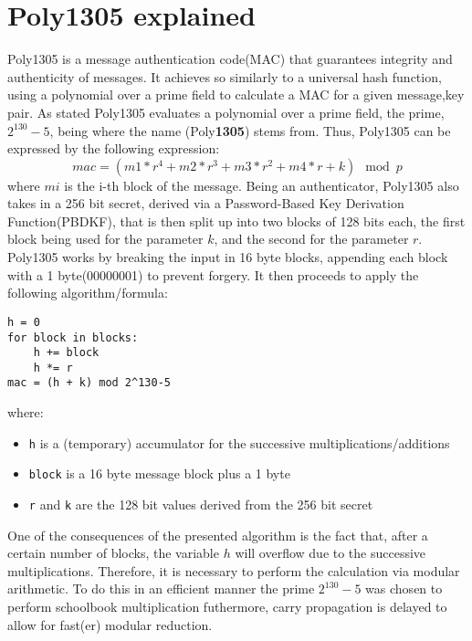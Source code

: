 \documentclass[twocolumn]{article}
\begin{document}
\section{Poly1305 explained}
Poly1305 is a message authentication code(MAC) that guarantees integrity and authenticity of messages. It achieves so similarly to a universal hash function, using a 
polynomial over a prime field to calculate a MAC for a given message,key pair. As stated Poly1305 evaluates a polynomial over a prime field, the prime, $2^{130}-5$, 
being where the name (Poly\textbf{1305}) stems from. Thus, Poly1305 can be expressed by the following expression: 
$$mac = (m1 * r^4 + m2 * r^3 + m3 * r^2 + m4 * r + k) \mod{p} $$ 
where $mi$ is the i-th block of the message. Being an authenticator, Poly1305 also takes in a 256 bit secret, derived via a Password-Based Key Derivation Function(PBDKF), 
that is then split up into two blocks of 128 bits each, the first block being used for the parameter $k$, and the second for the parameter $r$. Poly1305 works by breaking 
the input in 16 byte blocks, appending each block with a 1 byte(00000001) to prevent forgery. It then proceeds to apply the following algorithm/formula:

\begin{verbatim}
h = 0
for block in blocks:
    h += block
    h *= r
mac = (h + k) mod 2^130-5
\end{verbatim}

where:
\begin{itemize}
    \item \texttt{h} is a (temporary) accumulator for the successive multiplications/additions
    \item \texttt{block} is a 16 byte message block plus a 1 byte
    \item \texttt{r} and \texttt{k} are the 128 bit values derived from the 256 bit secret
\end{itemize}

One of the consequences of the presented algorithm is the fact that, after a certain number of blocks, the variable $h$ will overflow due to the successive multiplications.
Therefore, it is necessary to perform the calculation via modular arithmetic. To do this in an efficient manner the prime $2^{130}-5$ was chosen to perform schoolbook 
multiplication futhermore, carry propagation is delayed to allow for fast(er) modular reduction.
\end{document}
